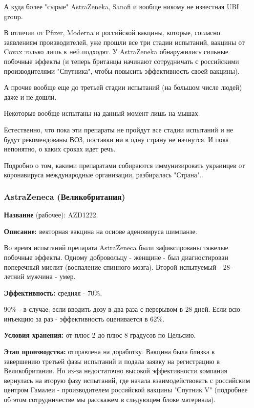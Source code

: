 А куда более "сырые" AstraZeneka, Sanofi и вообще никому не известная UBI
group. 

В отличии от Pfizer, Moderna и российской вакцины, которые, согласно заявлениям
производителей, уже прошли все три стадии испытаний, вакцины от Covax только
лишь к ней подходят. У AstraZeneka обнаружились сильные побочные эффекты (и
теперь британцы начинают сотрудничать с российскими производителями "Спутника",
чтобы повысить эффективность своей вакцины).

А прочие вообще еще до третьей стадии испытаний (на большом числе людей) даже и
не дошли.

Некоторые вообще испытаны на данный момент лишь на мышах.

Естественно, что пока эти препараты не пройдут все стадии испытаний и не будут
рекомендованы ВОЗ, поставки ни в одну страну не начнутся. И пока непонятно, о
каких сроках идет речь. 

Подробно о том, какими препаратами собираются иммунизировать украинцев от
коронавируса международные организации, разбиралась "Страна". 

\subsubsection{AstraZeneca (Великобритания)}

\textbf{Название} (рабочее): AZD1222. 

\textbf{Описание:} векторная вакцина на основе аденовируса шимпанзе. 

Во время испытаний препарата AstraZeneca были зафиксированы тяжелые побочные
эффекты. Одному добровольцу - женщине - был диагностирован поперечный миелит
(воспаление спинного мозга). Второй испытуемый - 28-летний мужчина - умер. 

\textbf{Эффективность:} средняя - 70\%. 

90\% - в случае, если вводить дозу в два раза с перерывом в 28 дней. Если всю
инъекцию за раз - эффективность оценивается в 62\%. 

\textbf{Условия хранения:} от плюс 2 до плюс 8 градусов по Цельсию. 

\textbf{Этап производства:} отправлена на доработку. Вакцина была близка к завершению
третьей фазы испытаний и подала заявку на регистрацию в Великобритании. Но
из-за недостаточно высокой эффективности компания вернулась на вторую фазу
испытаний, где начала взаимодействовать с российским центром Гамалеи -
производителем российской вакцины "Спутник V" (подробнее об этом сотрудничестве
мы расскажем в следующем блоке материала). 

